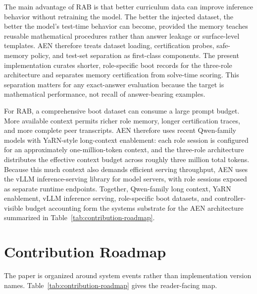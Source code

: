\documentclass[11pt]{article}
\newcommand{\rab}{RAB}
\begin{document}
The main advantage of \rab{} is that better curriculum data can improve inference behavior without retraining the model. The better the injected dataset, the better the model's test-time behavior can become, provided the memory teaches reusable mathematical procedures rather than answer leakage or surface-level templates. AEN therefore treats dataset loading, certification probes, safe-memory policy, and test-set separation as first-class components. The present implementation curates shorter, role-specific boot records for the three-role architecture and separates memory certification from solve-time scoring. This separation matters for any exact-answer evaluation because the target is mathematical performance, not recall of answer-bearing examples.

For \rab{}, a comprehensive boot dataset can consume a large prompt budget. More available context permits richer role memory, longer certification traces, and more complete peer transcripts. AEN therefore uses recent Qwen-family models with YaRN-style long-context enablement: each role session is configured for an approximately one-million-token context, and the three-role architecture distributes the effective context budget across roughly three million total tokens. Because this much context also demands efficient serving throughput, AEN uses the vLLM inference-serving library for model servers, with role sessions exposed as separate runtime endpoints. Together, Qwen-family long context, YaRN enablement, vLLM inference serving, role-specific boot datasets, and controller-visible budget accounting form the systems substrate for the AEN architecture summarized in Table~\ref{tab:contribution-roadmap}.

\section{Contribution Roadmap}

The paper is organized around system events rather than implementation version names. Table~\ref{tab:contribution-roadmap} gives the reader-facing map.
\end{document}
